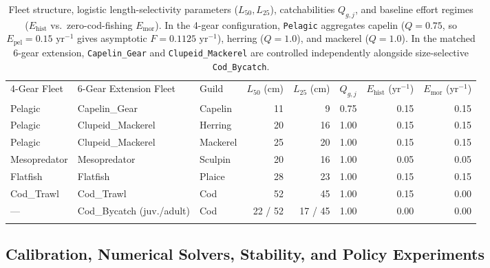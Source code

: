 \documentclass[11pt,letterpaper]{article}
\newcommand{\toprule}{\noalign{\hrule height 0.85pt\vspace{2.5pt}}}
\newcommand{\midrule}{\noalign{\vspace{2pt}\hrule height 0.45pt\vspace{2.5pt}}}
\newcommand{\bottomrule}{\noalign{\vspace{2pt}\hrule height 0.85pt}}
\begin{document}
\begin{table}[t!]
\centering
\caption{Fleet structure, logistic length-selectivity parameters ($L_{50}, L_{25}$), catchabilities $Q_{g,j}$, and baseline effort regimes ($E_{\mathrm{hist}}$ vs.\ zero-cod-fishing $E_{\mathrm{mor}}$). In the 4-gear configuration, \texttt{Pelagic} aggregates capelin ($Q = 0.75$, so $E_{\mathrm{pel}} = 0.15\text{ yr}^{-1}$ gives asymptotic $F = 0.1125\text{ yr}^{-1}$), herring ($Q = 1.0$), and mackerel ($Q = 1.0$). In the matched 6-gear extension, \texttt{Capelin\_Gear} and \texttt{Clupeid\_Mackerel} are controlled independently alongside size-selective \texttt{Cod\_Bycatch}.}
\label{tab:gears}
\vspace{0.35em}
{\footnotesize
\setlength{\tabcolsep}{5.2pt}
\begin{tabular}{lllrrrrr}
\toprule
4-Gear Fleet & 6-Gear Extension Fleet & Guild & $L_{50}$ (cm) & $L_{25}$ (cm) & $Q_{g,j}$ & $E_{\mathrm{hist}}$ ($\text{yr}^{-1}$) & $E_{\mathrm{mor}}$ ($\text{yr}^{-1}$) \\
\midrule
Pelagic      & Capelin\_Gear     & Capelin  & 11 &  9 & 0.75 & 0.15 & 0.15 \\
Pelagic      & Clupeid\_Mackerel & Herring  & 20 & 16 & 1.00 & 0.15 & 0.15 \\
Pelagic      & Clupeid\_Mackerel & Mackerel & 25 & 20 & 1.00 & 0.15 & 0.15 \\
Mesopredator & Mesopredator      & Sculpin  & 20 & 16 & 1.00 & 0.05 & 0.05 \\
Flatfish     & Flatfish          & Plaice   & 28 & 23 & 1.00 & 0.15 & 0.15 \\
Cod\_Trawl   & Cod\_Trawl        & Cod      & 52 & 45 & 1.00 & 0.15 & 0.00 \\
---          & Cod\_Bycatch (juv./adult) & Cod & 22 / 52 & 17 / 45 & 1.00 & 0.00 & 0.00 \\
\bottomrule
\end{tabular}
}
\end{table}

\subsection{Calibration, Numerical Solvers, Stability, and Policy Experiments}
\end{document}
